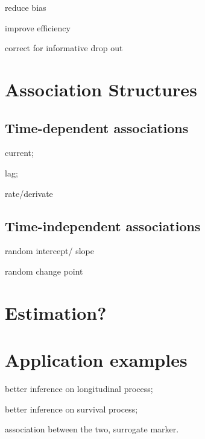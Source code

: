 \documentclass{article}
\numberwithin{equation}{section}
\begin{document}
reduce bias

improve efficiency

correct for informative drop out

\section{Association Structures}
\subsection{Time-dependent associations}
current;

lag;

rate/derivate

\subsection{Time-independent associations}
random intercept/ slope

random change point

\section{Estimation?}

\section{Application examples}
better inference on longitudinal process;

better inference on survival process;

association between the two, surrogate marker.

 
	
\end{document}
